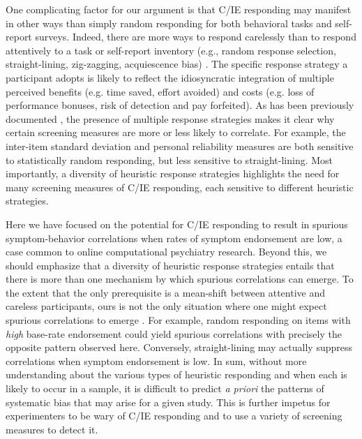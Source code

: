 \documentclass[a4paper,notitlepage,12pt]{article}
\begin{document}
\begin{refsection}[main]
One complicating factor for our argument is that C/IE responding may manifest in other ways than simply random responding for both behavioral tasks and self-report surveys. Indeed, there are more ways to respond carelessly than to respond attentively to a task or self-report inventory (e.g., random response selection, straight-lining, zig-zagging, acquiescence bias) \cite{curran2016methods}. The specific response strategy a participant adopts is likely to reflect the idiosyncratic integration of multiple perceived benefits (e.g. time saved, effort avoided) and costs (e.g. loss of performance bonuses, risk of detection and pay forfeited). As has been previously documented \cite{desimone2018dirty}, the presence of multiple response strategies makes it clear why certain screening measures are more or less likely to correlate. For example, the inter-item standard deviation and personal reliability measures are both sensitive to statistically random responding, but less sensitive to straight-lining. Most importantly, a diversity of heuristic response strategies highlights the need for many screening measures of C/IE responding, each sensitive to different heuristic strategies. 

Here we have focused on the potential for C/IE responding to result in spurious symptom-behavior correlations when rates of symptom endorsement are low, a case common to online computational psychiatry research. Beyond this, we should emphasize that a diversity of heuristic response strategies entails that there is more than one mechanism by which spurious correlations can emerge. To the extent that the only prerequisite is a mean-shift between attentive and careless participants, ours is not the only situation where one might expect spurious correlations to emerge \cite{huang2015insufficient}. For example, random responding on items with \emph{high} base-rate endorsement could yield spurious correlations with precisely the opposite pattern observed here. Conversely, straight-lining may actually suppress correlations when symptom endorsement is low. In sum, without more understanding about the various types of heuristic responding and when each is likely to occur in a sample, it is difficult to predict {\it a priori} the patterns of systematic bias that may arise for a given study. This is further impetus for experimenters to be wary of C/IE responding and to use a variety of screening measures to detect it. 


\end{refsection}
\end{document}
